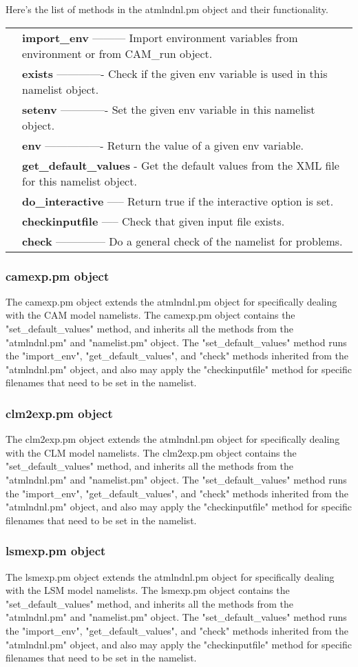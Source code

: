 \documentclass[]{article}
\begin{document}
Here's the list of methods in the atmlndnl.pm object and their functionality.\\
\begin{tabular}{r p{3.7in}}
	& {\bf import\_env} --------- Import environment variables from environment or from CAM\_run object. \\
	& {\bf exists} ------------- Check if the given env variable is used in this namelist object.\\
	& {\bf setenv} ------------- Set the given env variable in this namelist object.\\
	& {\bf env} ---------------- Return the value of a given env variable.\\
	& {\bf get\_default\_values} - Get the default values from the XML file for this namelist object.\\
	& {\bf do\_interactive} ----- Return true if the interactive option is set.\\
	& {\bf checkinputfile} ----- Check that given input file exists.\\
	& {\bf check} -------------- Do a general check of the namelist for problems.
\end{tabular}
\subsubsection{camexp.pm object}
The camexp.pm object extends the atmlndnl.pm object for specifically dealing with the CAM
model namelists. The camexp.pm object contains the "set\_default\_values" method, and inherits
all the methods from the "atmlndnl.pm" and "namelist.pm" object. The "set\_default\_values"
method runs the "import\_env", "get\_default\_values", and "check" methods inherited from
the "atmlndnl.pm" object, and also may apply the "checkinputfile" method for specific
filenames that need to be set in the namelist.
\subsubsection{clm2exp.pm object}
The clm2exp.pm object extends the atmlndnl.pm object for specifically dealing with the CLM
model namelists. The clm2exp.pm object contains the "set\_default\_values" method, and inherits
all the methods from the "atmlndnl.pm" and "namelist.pm" object. The "set\_default\_values"
method runs the "import\_env", "get\_default\_values", and "check" methods inherited from
the "atmlndnl.pm" object, and also may apply the "checkinputfile" method for specific
filenames that need to be set in the namelist.
\subsubsection{lsmexp.pm object}
The lsmexp.pm object extends the atmlndnl.pm object for specifically dealing with the LSM
model namelists. The lsmexp.pm object contains the "set\_default\_values" method, and inherits
all the methods from the "atmlndnl.pm" and "namelist.pm" object. The "set\_default\_values"
method runs the "import\_env", "get\_default\_values", and "check" methods inherited from
the "atmlndnl.pm" object, and also may apply the "checkinputfile" method for specific
filenames that need to be set in the namelist.
\end{document}
